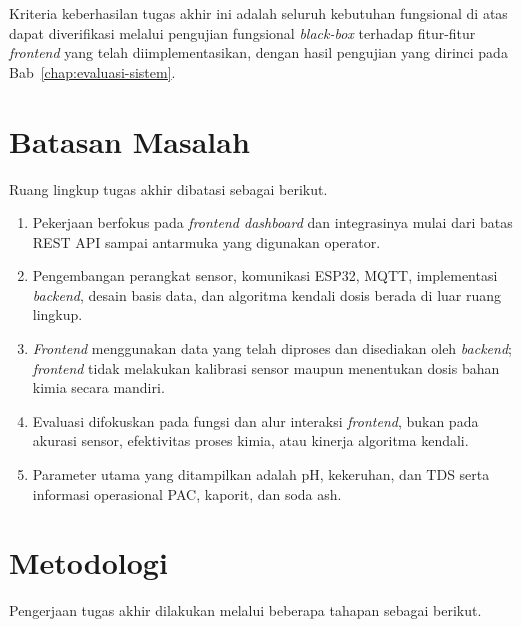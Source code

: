 Kriteria keberhasilan tugas akhir ini adalah seluruh kebutuhan fungsional di
atas dapat diverifikasi melalui pengujian fungsional \textit{black-box}
terhadap fitur-fitur \textit{frontend} yang telah diimplementasikan, dengan
hasil pengujian yang dirinci pada Bab~\ref{chap:evaluasi-sistem}.

\section{Batasan Masalah}
Ruang lingkup tugas akhir dibatasi sebagai berikut.
\begin{enumerate}
    \item Pekerjaan berfokus pada \textit{frontend dashboard} dan integrasinya mulai dari
    batas REST API sampai antarmuka yang digunakan operator.
    \item Pengembangan perangkat sensor, komunikasi ESP32, MQTT, implementasi
    \textit{backend}, desain basis data, dan algoritma kendali dosis berada di luar ruang
    lingkup.
    \item \textit{Frontend} menggunakan data yang telah diproses dan disediakan oleh
    \textit{backend}; \textit{frontend} tidak melakukan kalibrasi sensor maupun menentukan dosis
    bahan kimia secara mandiri.
    \item Evaluasi difokuskan pada fungsi dan alur interaksi \textit{frontend}, bukan pada
    akurasi sensor, efektivitas proses kimia, atau kinerja algoritma kendali.
    \item Parameter utama yang ditampilkan adalah pH, kekeruhan, dan TDS serta
    informasi operasional PAC, kaporit, dan soda ash.
\end{enumerate}

\section{Metodologi}

Pengerjaan tugas akhir dilakukan melalui beberapa tahapan sebagai berikut.

